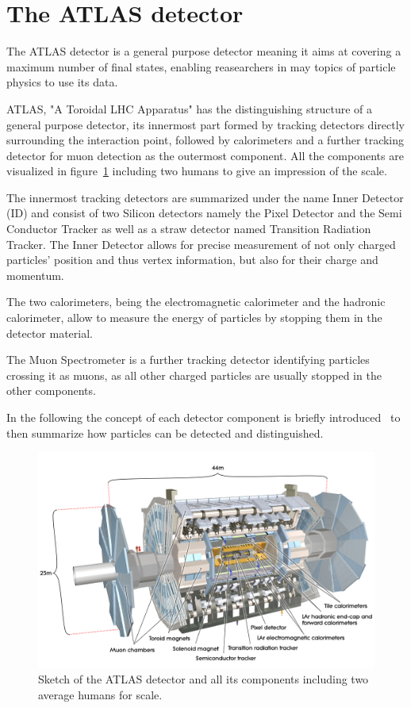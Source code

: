 \section{The ATLAS detector}

The ATLAS detector is a general purpose detector meaning it aims at covering a maximum number of final states, enabling reasearchers in may topics of particle physics to use its data.

ATLAS, "A Toroidal LHC Apparatus" has the distinguishing structure of a general purpose detector, its innermost part formed by tracking detectors directly surrounding the interaction point, followed by calorimeters and a further tracking detector for muon detection as the outermost component. All the components are visualized in figure~\ref{fig:atlas} including two humans to give an impression of the scale.

The innermost tracking detectors are summarized under the name Inner Detector (ID) and consist of two Silicon detectors namely the Pixel Detector and the Semi Conductor Tracker as well as a straw detector named Transition Radiation Tracker. The Inner Detector allows for precise measurement of not only charged particles' position and thus vertex information, but also for their charge and momentum.

The two calorimeters, being the electromagnetic calorimeter and the hadronic calorimeter, allow to measure the energy of particles by stopping them in the detector material.

The Muon Spectrometer is a further tracking detector identifying particles crossing it as muons, as all other charged particles are usually stopped in the other components.

In the following the concept of each detector component is briefly introduced~\cite{wermes} to then summarize how particles can be detected and distinguished.



\begin{figure}[htbp]
  \centering
  \includegraphics[scale=0.15]{figures_LHC/atlas-detector}
  \caption[Sketch of the ATLAS detector]{Sketch of the ATLAS detector and all its components including two average humans for scale.~\cite{Pequenao:1095924}}
  \label{fig:atlas}
\end{figure}



